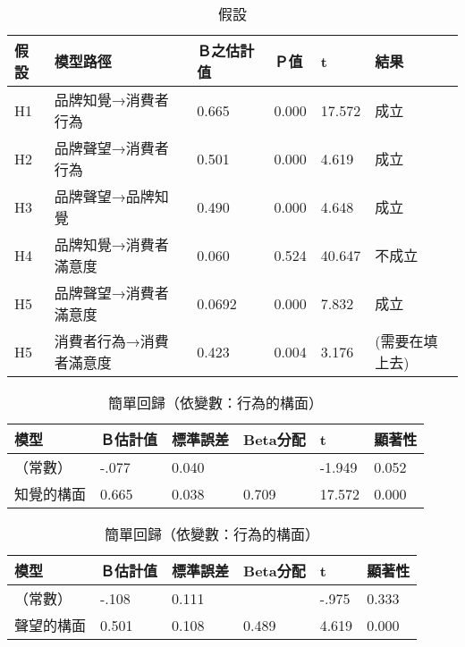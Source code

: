 \begin{table}[htb]
\caption{假設}
\label{tab:p7}
\renewcommand{\arraystretch}{1.2} %
\arrayrulewidth=1pt               %
\tabcolsep=10pt                   %
\begin{tabular}[t]{llllll}  %
\hline
 假設&模型路徑&Ｂ之估計值& Ｐ值& t& 結果 \\
\hline
H1&品牌知覺→消費者行為&0.665&0.000&17.572&成立\\
H2&品牌聲望→消費者行為&0.501&0.000&4.619&成立\\
H3&品牌聲望→品牌知覺&0.490&0.000&4.648&成立\\
H4&品牌知覺→消費者滿意度&0.060&0.524&40.647&不成立\\
H5&品牌聲望→消費者滿意度&0.0692&0.000&7.832&成立\\
H5&消費者行為→消費者滿意度&0.423&0.004&3.176&(需要在填上去)\\
\hline
\end{tabular}
\end{table}

\begin{table}[htb]
\caption{簡單回歸（依變數：行為的構面）}
\label{tab:r01}
\renewcommand{\arraystretch}{1.2} %
\arrayrulewidth=1pt               %
\tabcolsep=10pt                   %
\begin{tabular}[t]{llllll}  %
\hline
 模型&Ｂ估計值&標準誤差&Beta分配&t&顯著性\\
\hline
（常數）&-.077&0.040& &-1.949&0.052\\
知覺的構面&0.665&0.038&0.709&17.572&0.000\\
\hline
\end{tabular}
\end{table}

\begin{table}[htb]
\caption{簡單回歸（依變數：行為的構面）}
\label{tab:r02}
\renewcommand{\arraystretch}{1.2} %
\arrayrulewidth=1pt               %
\tabcolsep=10pt                   %
\begin{tabular}[t]{llllll}  %
\hline
 模型&Ｂ估計值&標準誤差&Beta分配&t&顯著性\\
\hline
（常數）&-.108&0.111& &-.975&0.333\\
聲望的構面&0.501&0.108&0.489&4.619&0.000\\
\hline
\end{tabular}
\end{table}

